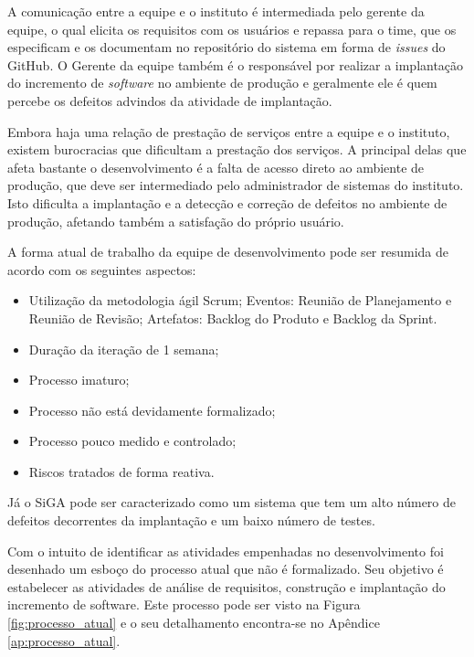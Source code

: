 A comunicação entre a equipe e o instituto é intermediada pelo gerente da equipe, o qual elicita os requisitos 
com os usuários e repassa para o time, que os especificam e os documentam no repositório do sistema em forma de
\textit{issues} do GitHub. O Gerente da equipe também é o responsável por realizar a implantação do incremento de
\textit{software} no ambiente de produção e geralmente ele é quem percebe os defeitos advindos da atividade de implantação.

Embora haja uma relação de prestação de serviços entre a equipe e o instituto, existem burocracias que dificultam a prestação
dos serviços. A principal delas que afeta bastante o desenvolvimento é a falta de acesso direto ao ambiente de produção, que deve 
ser intermediado pelo administrador de sistemas do instituto. Isto dificulta a implantação e a detecção e correção de defeitos 
no ambiente de produção, afetando também a satisfação do próprio usuário.

A forma atual de trabalho da equipe de desenvolvimento pode ser resumida de acordo com os seguintes aspectos:

\begin{itemize}
  \item Utilização da metodologia ágil Scrum;
    \subitem Eventos: Reunião de Planejamento e Reunião de Revisão;
    \subitem Artefatos: Backlog do Produto e Backlog da Sprint.
  \item Duração da iteração de 1 semana;
  \item Processo imaturo;
  \item Processo não está devidamente formalizado;
  \item Processo pouco medido e controlado;
  \item Riscos tratados de forma reativa.
\end{itemize}

Já o SiGA pode ser caracterizado como um sistema que tem um alto número de defeitos decorrentes da implantação e um baixo número de testes.

Com o intuito de identificar as atividades empenhadas no desenvolvimento foi desenhado um esboço do processo atual 
que não é formalizado. Seu objetivo é estabelecer
as atividades de análise de requisitos, construção e implantação do incremento de software. Este processo pode ser visto na 
Figura \ref{fig:processo_atual} e o seu detalhamento encontra-se no Apêndice \ref{ap:processo_atual}.


